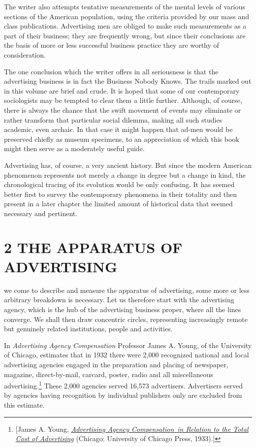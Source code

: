 \documentclass[nohyper,openany,nobib]{tufte-book}
\let\oldchapter\chapter
\def\chapter{%
  \setcounter{footnote}{0}%
  \oldchapter
}
\begin{document}
The writer also attempts tentative measurements of the mental levels of
various sections of the American population, using the criteria provided
by our mass and class publications. Advertising men are obliged to make
such measurements as a part of their business; they are frequently
wrong, but since their conclusions are the basis of more or less
successful business practice they are worthy of consideration.

The one conclusion which the writer offers in all seriousness is that
the advertising business is in fact the Business Nobody Knows. The
trails marked out in this volume are brief and crude. It is hoped that
some of our contemporary sociologists may be tempted to clear them a
little further. Although, of course, there is always the chance that the
swift movement of events may eliminate or rather transform that
particular social dilemma, making all such studies academic, even
archaic. In that case it might happen that ad-men would be preserved
chiefly as museum specimens, to an appreciation of which this book might
then serve as a moderately useful guide.

Advertising has, of course, a very ancient history. But since the modern
American phenomenon represents not merely a change in degree but a
change in kind, the chronological tracing of its evolution would be only
confusing. It has seemed better first to survey the contemporary
phenomena in their totality and then present in a later chapter the
limited amount of historical data that seemed necessary and pertinent.\\



\chapter[2 \hspace*{1mm} THE APPARATUS OF ADVERTISING]{2 THE APPARATUS OF ADVERTISING}

 we come to describe and measure the apparatus of advertising, some
more or less arbitrary breakdown is necessary. Let us therefore start
with the advertising agency, which is the hub of the advertising
business proper, where all the lines converge. We shall then draw
concentric circles, representing increasingly remote but genuinely
related institutions, people and activities.

In \emph{Advertising Agency Compensation} Professor James A. Young, of
the University of Chicago, estimates that in 1932 there were 2,000
recognized national and local advertising agencies engaged in the
preparation and placing of newspaper, magazine, direct-by-mail, carcard,
poster, radio and all miscellaneous advertising.\footnote{{[}James A. Young,
  \emph{\href{http://www.worldcat.org/oclc/3291593}{Advertising Agency
  Compensation}}\href{http://www.worldcat.org/oclc/3291593}{~}\emph{\href{http://www.worldcat.org/oclc/3291593}{in
  Relation to the Total Cost of Advertising}} (Chicago: University of
  Chicago Press, 1933).{]}} These 2,000 agencies
served 16,573 advertisers. Advertisers served by agencies having
recognition by individual publishers only are excluded from this
estimate.
\end{document}
